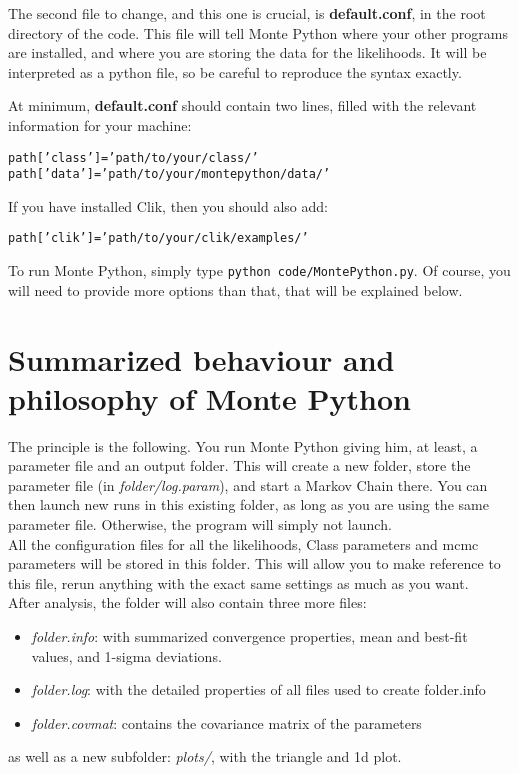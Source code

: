 \documentclass[10pt]{article}
\begin{document}
 The second file to change, and this one is crucial, is {\bf default.conf}, in
 the root directory of the code. This file will tell Monte Python where your
 other programs are installed, and where you are storing the data for the
 likelihoods. It will be interpreted as a python file, so be careful to
 reproduce the syntax exactly.

 At minimum, {\bf default.conf} should contain two lines, filled with the
 relevant information for your machine:
 \begin{alltt}
   path['class']   = 'path/to/your/class/'
   path['data']    = 'path/to/your/montepython/data/'
 \end{alltt}
 
 If you have installed Clik, then you should also add:
 \begin{alltt}
   path['clik']    = 'path/to/your/clik/examples/'
 \end{alltt}
 
 To run Monte Python, simply type \verb?python code/MontePython.py?. Of course,
 you will need to provide more options than that, that will be explained below. 

\newpage
\section{Summarized behaviour and philosophy of Monte Python}

  The principle is the following. You run Monte Python giving him, at least, a
  parameter file and an output folder. This will create a new folder, store the
  parameter file (in \emph{folder/log.param}), and start a Markov Chain there.
  You can then launch new runs in this existing folder, as long as you are
  using the same parameter file.  Otherwise, the program will simply not
  launch.\\

  All the configuration files for all the likelihoods, Class parameters and
  mcmc parameters will be stored in this folder. This will allow you to make
  reference to this file, rerun anything with the exact same settings as much
  as you want.\\

  After analysis, the folder will also contain three more files:
  \begin{itemize}
    \item \emph{folder.info}: with summarized convergence properties, mean and
      best-fit values, and 1-sigma deviations.
    \item \emph{folder.log}:  with the detailed properties of all files used to create
      folder.info
    \item \emph{folder.covmat}: contains the covariance matrix of the parameters
  \end{itemize}
  as well as a new subfolder: \emph{plots/}, with the triangle and 1d plot.
\end{document}
